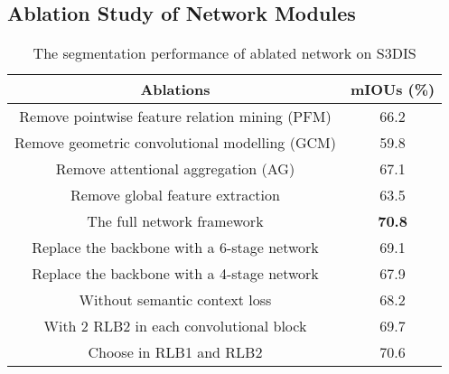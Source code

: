 \documentclass[journal]{IEEEtran}
\begin{document}
\subsection{Ablation Study of Network Modules}
\begin{table}[bp!]
\caption{The segmentation performance of ablated network on S3DIS}
\label{ablation}
\begin{center}
\begin{tabular}{cc}
\toprule


Ablations & mIOUs (\%)\\

\hline
Remove pointwise feature relation mining (PFM)&66.2\\ 

Remove geometric convolutional modelling (GCM)&59.8\\

Remove attentional aggregation (AG)&67.1\\

Remove global feature extraction&63.5\\

The full network framework&\textbf{70.8}\\

Replace the backbone with a 6-stage network&69.1\\

Replace the backbone with a 4-stage network&67.9\\

Without semantic context loss &68.2\\

With 2 RLB2 in each convolutional block&69.7\\

Choose  in RLB1 and RLB2 &70.6\\
\bottomrule
\end{tabular}
\end{center}
\vspace{-2mm}
\end{table}
\end{document}
